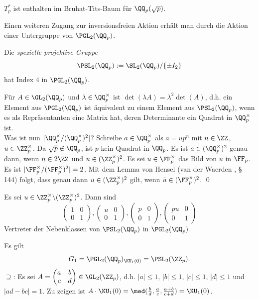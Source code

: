 $T_p^*$ ist enthalten im Bruhat-Tits-Baum für $\QQ_p(\sqrt{p})$.

Einen weiteren Zugang zur inversionsfreien Aktion erhält man
durch die Aktion einer Untergruppe von $\PGL_2(\QQ_p)$.

\BEM Die \emph{spezielle projektive Gruppe}
\[
\PSL_2(\QQ_p) := \SL_2(\QQ_p)/\{\pm I_2\}
\]
hat Index $4$ in $\PGL_2(\QQ_p)$.

\bew Für $A\in\GL_2(\QQ_p)$ und $\lambda\in\QQ_p^\times$ ist
$\det(\lambda A)=\lambda^2\det(A)$, d.h. ein Element aus
$\PGL_2(\QQ_p)$ ist äquivalent zu einem Element aus
$\PSL_2(\QQ_p)$, wenn es als Repräsentanten eine Matrix hat,
deren Determinante ein Quadrat in $\QQ_p^\times$ ist.\\
Was ist nun $|\QQ_p^\times/(\QQ_p^\times)^2|$?
Schreibe $a\in \QQ_p^\times$ als $a=up^n$ mit $n\in\ZZ$,
$u\in\ZZ_p^\times$. Da $\sqrt{p}\not\in\QQ_p$, ist $p$ kein Quadrat
in $\QQ_p$.
Es ist $a\in(\QQ_p^\times)^2$ genau dann,
wenn $n\in 2\ZZ$ und $u\in(\ZZ_p^\times)^2$. Es sei
$\bar{u}\in\FF_p^\times$ das Bild von $u$ in $\FF_p$.
Es ist $|\FF_p^\times/(\FF_p^\times)^2|=2$. Mit dem Lemma von Hensel
(van der Waerden \cite{vdW}, § 144)
folgt, dass genau dann $u\in(\ZZ_p^\times)^2$ gilt, wenn
$\bar{u}\in(\FF_p^\times)^2$.
\qed

\FOLG Es sei $u\in\ZZ_p^\times\backslash(\ZZ_p^\times)^2$. Dann sind
\[
\begin{pmatrix}
1 & 0 \\
0 & 1
\end{pmatrix},
\begin{pmatrix}
u & 0 \\
0 & 1
\end{pmatrix},
\begin{pmatrix}
p & 0 \\
0 & 1
\end{pmatrix},
\begin{pmatrix}
pu & 0 \\
0 & 1
\end{pmatrix}
\]
Vertreter der Nebenklassen von $\PSL_2(\QQ_p)$ in $\PGL_2(\QQ_p)$.

\PROP Es gilt
\[
G_1 = \PGL_2(\QQ_p)_{\KU_1(0)} = \PSL_2(\ZZ_p).
\]
\bew
\glqq$\supseteq$\grqq:
Es sei $A=\begin{pmatrix}
a & b \\
c & d
\end{pmatrix}
\in\GL_2(\ZZ_p)$, d.h. $|a|\leq 1$, $|b|\leq 1$, $|c|\leq 1$,
$|d|\leq 1$ und $|ad-bc|=1$.
Zu zeigen ist
$A\cdot\KU_1(0)=\med(\frac{b}{d},\frac{a}{c},\frac{a+b}{c+d})
=\KU_1(0)$.

